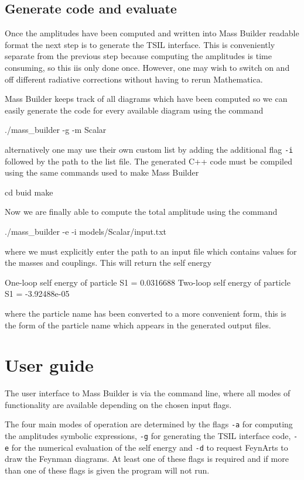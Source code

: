 \subsection{Generate code and evaluate}

Once the amplitudes have been computed and written into Mass Builder readable format the next step is to generate the TSIL interface.  This is conveniently separate from the previous step because computing the amplitudes is time consuming, so this iis only done once.  However, one may wish to switch on and off different radiative corrections without having to rerun Mathematica.

Mass Builder keeps track of all diagrams which have been computed so we can easily generate the code for every available diagram using the command
\begin{lstterm}
./mass_builder -g -m Scalar
\end{lstterm}
alternatively one may use their own custom list by adding the additional flag \lstinline{-i} followed by the path to the list file.  The generated C++ code must be compiled using the same commands used to make Mass Builder
\begin{lstterm}
cd buid
make
\end{lstterm}

Now we are finally able to compute the total amplitude using the command
\begin{lstterm}
./mass_builder -e -i models/Scalar/input.txt
\end{lstterm}
where we must explicitly enter the path to an input file which contains values for the masses and couplings.  This will return the self energy
\begin{lstterm}
One-loop self energy of particle S1 = 0.0316688
Two-loop self energy of particle S1 = -3.92488e-05
\end{lstterm}
where the particle name has been converted to a more convenient form, this is the form of the particle name which appears in the generated output files.

\section{User guide}\label{sec:user_guide}

The user interface to Mass Builder is via the command line, where all modes of functionality are available depending on the chosen input flags.

The four main modes of operation are determined by the flags \lstinline{-a} for computing the amplitudes symbolic expressions, \lstinline{-g} for generating the TSIL interface code, \lstinline{-e} for the numerical evaluation of the self energy and \lstinline{-d} to request FeynArts to draw the Feynman diagrams.  At least one of these flags is required and if more than one of these flags is given the program will not run.

